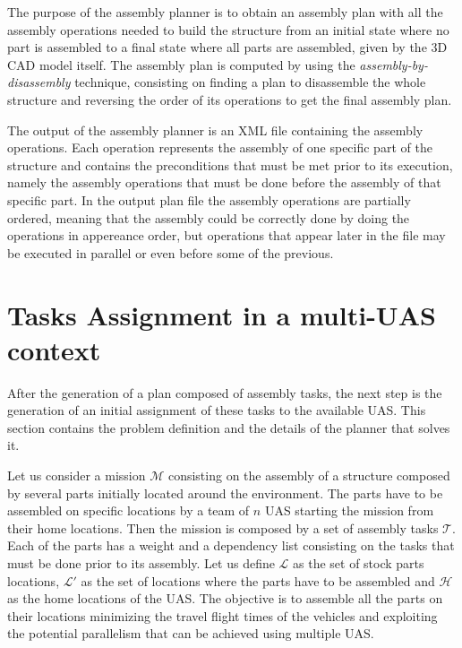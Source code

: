 \documentclass[letterpaper, 12pt, conference]{ieeeconf}    %
\begin{document}
The purpose of the assembly planner is to obtain an assembly plan with all the assembly operations needed to build the structure from an initial state where no part is assembled to a final state where all parts are assembled, given by the 3D CAD model itself. The assembly plan is computed by using the \emph{assembly-by-disassembly} technique, consisting on finding a plan to disassemble the whole structure and reversing the order of its operations to get the final assembly plan.

The output of the assembly planner is an XML file containing the assembly operations. Each operation represents the assembly of one specific part of the structure and contains the preconditions that must be met prior to its execution, namely the assembly operations that must be done before the assembly of that specific part. In the output plan file the assembly operations are partially ordered, meaning that the assembly could be correctly done by doing the operations in appereance order, but operations that appear later in the file may be executed in parallel or even before some of the previous.

\section{Tasks Assignment in a multi-UAS context}
\label{sec:ata}

After the generation of a plan composed of assembly tasks, the next step is the generation of an initial assignment of these tasks to the available UAS. This section contains the problem definition and the details of the planner that solves it.
    
Let us consider a mission $\mathcal{M}$ consisting on the assembly of a structure composed by several parts initially located around the environment. The parts have to be assembled on specific locations by a team of $n$ UAS starting the mission from their home locations. Then the mission is composed by a set of assembly tasks $\mathcal{T}$. Each of the parts has a weight and a dependency list consisting on the tasks that must be done prior to its assembly. Let us define $\mathcal{L}$ as the set of stock parts locations, $\mathcal{L'}$ as the set of locations where the parts have to be assembled and $\mathcal{H}$ as the home locations of the UAS. The objective is to assemble all the parts on their locations minimizing the travel flight times of the vehicles and exploiting the potential parallelism that can be achieved using multiple UAS.
    
\end{document}
